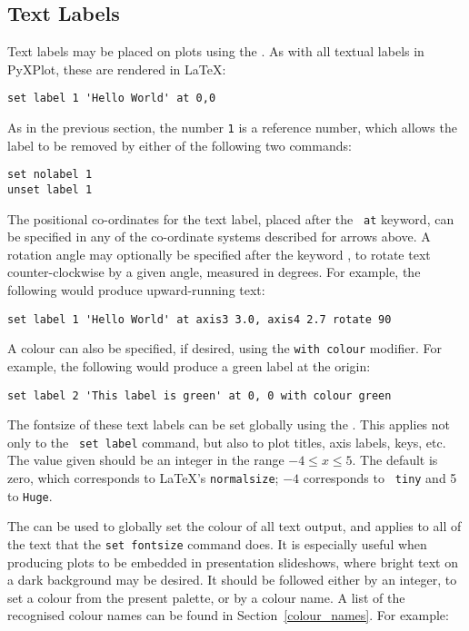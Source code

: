 \subsection{Text Labels}

Text labels may be placed on plots using the . As with all
textual labels in PyXPlot, these are rendered in \LaTeX:

\begin{verbatim}
set label 1 'Hello World' at 0,0
\end{verbatim}

As in the previous section, the number {\tt 1} is a reference number, which
allows the label to be removed by either of the following two commands:

\begin{verbatim}
set nolabel 1
unset label 1
\end{verbatim}

\noindent The positional co-ordinates for the text label, placed after the {\tt
at} keyword, can be specified in any of the co-ordinate systems described for
arrows above. A rotation angle may optionally be specified after the keyword
, to rotate text counter-clockwise by a given angle, measured
in degrees. For example, the following would produce upward-running text:

\begin{verbatim}
set label 1 'Hello World' at axis3 3.0, axis4 2.7 rotate 90
\end{verbatim}

A colour can also be specified, if desired, using the {\tt with colour}
modifier.  For example, the following would produce a green label at the origin:

\begin{verbatim}
set label 2 'This label is green' at 0, 0 with colour green
\end{verbatim}

 The fontsize of these text labels can be set
globally using the . This applies not only to the {\tt
set label} command, but also to plot titles, axis labels, keys, etc. The value
given should be an integer in the range $-4 \leq x \leq 5$. The default is
zero, which corresponds to \LaTeX's {\tt normalsize}; $-4$ corresponds to {\tt
tiny} and 5 to {\tt Huge}.

 The  can be
used to globally set the colour of all text output, and applies to all of the
text that the {\tt set fontsize} command does. It is especially useful when
producing plots to be embedded in presentation slideshows, where bright text on
a dark background may be desired. It should be followed either by an integer,
to set a colour from the present palette, or by a colour name. A list of the
recognised colour names can be found in Section~\ref{colour_names}.  For
example:

